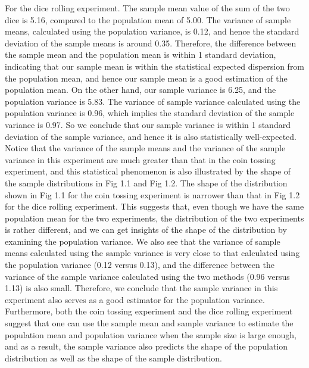 \documentclass[11pt]{book}
\theoremstyle{break}
\theoremstyle{break}
\begin{document}
For the dice rolling experiment. The sample mean value of the sum of the two dice is 5.16, compared to the population mean of 5.00. The variance of sample means, calculated using the population variance, is 0.12, and hence the standard deviation of the sample means is around 0.35. Therefore, the difference between the sample mean and the population mean is within 1 standard deviation, indicating that our sample mean is within the statistical expected dispersion from the population mean, and hence our sample mean is a good estimation of the population mean. On the other hand, our sample variance is 6.25, and the population variance is 5.83. The variance of sample variance calculated using the population variance is 0.96, which implies the standard deviation of the sample variance is 0.97. So we conclude that our sample variance is within 1 standard deviation of the sample variance, and hence it is also statistically well-expected. Notice that the variance of the sample means and the variance of the sample variance in this experiment are much greater than that in the coin tossing experiment, and this statistical phenomenon is also illustrated by the shape of the sample distributions in Fig 1.1 and Fig 1.2. The shape of the distribution shown in Fig 1.1 for the coin tossing experiment is narrower than that in Fig 1.2 for the dice rolling experiment. This suggests that, even though we have the same population mean for the two experiments, the distribution of the two experiments is rather different, and we can get insights of the shape of the distribution by examining the population variance. We also see that the variance of sample means calculated using the sample variance is very close to that calculated using the population variance (0.12 versus 0.13), and the difference between the variance of the sample variance calculated using the two methods (0.96 versus 1.13) is also small. Therefore, we conclude that the sample variance in this experiment also serves as a good estimator for the population variance. Furthermore, both the coin tossing experiment and the dice rolling experiment suggest that one can use the sample mean and sample variance to estimate the population mean and population variance when the sample size is large enough, and as a result, the sample variance also predicts the shape of the population distribution as well as the shape of the sample distribution. \\
\end{document}
